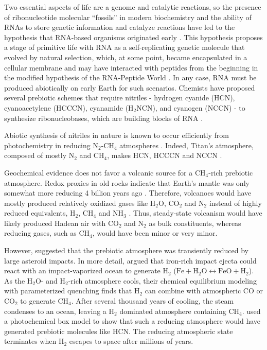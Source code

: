 Two essential aspects of life are a genome and catalytic reactions, so the presence of ribonucleotide molecular ``fossils'' in modern biochemistry \citep{White_1976,Goldman_2021} and the ability of RNAs to store genetic information and catalyze reactions have led to the hypothesis that RNA-based organisms originated early \citep{Cech_2012}. This hypothesis proposes a stage of primitive life with RNA as a self-replicating genetic molecule that evolved by natural selection, which, at some point, became encapsulated in a cellular membrane and may have interacted with peptides from the beginning in the modified hypothesis of the RNA-Peptide World \citep[e.g.][]{Di_1997,Muller_2022}. In any case, RNA must be produced abiotically on early Earth for such scenarios. Chemists have proposed several prebiotic schemes that require nitriles - hydrogen cyanide (HCN), cyanoacetylene (HCCCN), cyanamide (H$_2$NCN), and cyanogen (NCCN) - to synthesize ribonucleobases, which are building blocks of RNA \citep{Benner_2020,Sutherland_2016,Yadav_2020}.

Abiotic synthesis of nitriles in nature is known to occur efficiently from photochemistry in reducing N$_2$-CH$_4$ atmospheres \citep{Zahnle_1986,Tian_2011}. Indeed, Titan's atmosphere, composed of mostly N$_2$ and CH$_4$, makes HCN, HCCCN and NCCN \citep{Strobel_2009}.

Geochemical evidence does not favor a volcanic source for a CH$_4$-rich prebiotic atmosphere. Redox proxies in old rocks indicate that Earth's mantle was only somewhat more reducing 4 billion years ago \citep{Aulbach_2016,Nicklas_2019}. Therefore, volcanoes would have mostly produced relatively oxidized gases like H$_2$O, CO$_2$ and N$_2$ instead of highly reduced equivalents, H$_2$, CH$_4$ and NH$_3$ \citep{Holland_1984,Catling_2017,Wogan_2020}. Thus, steady-state volcanism would have likely produced Hadean air with CO$_2$ and N$_2$ as bulk constituents, whereas reducing gases, such as CH$_4$, would have been minor or very minor.

However, \citet{Urey_1952} suggested that the prebiotic atmosphere was transiently reduced by large asteroid impacts. In more detail, \citet{Zahnle_2020} argued that iron-rich impact ejecta could react with an impact-vaporized ocean to generate H$_2$ ($\mathrm{Fe} + \mathrm{H_2O} \leftrightarrow \mathrm{FeO} + \mathrm{H_2}$). As the H$_2$O- and H$_2$-rich atmosphere cools, their chemical equilibrium modeling with parameterized quenching finds that H$_2$ can combine with atmospheric CO or CO$_2$ to generate CH$_4$. After several thousand years of cooling, the steam condenses to an ocean, leaving a H$_2$ dominated atmosphere containing CH$_4$. \citet{Zahnle_2020} used a photochemical box model to show that such a reducing atmosphere would have generated prebiotic molecules like HCN. The reducing atmospheric state terminates when H$_2$ escapes to space after millions of years.

